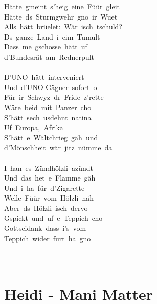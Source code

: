 \documentclass[]{book}
\let\stdsection\section
\renewcommand\section{\clearpage\stdsection}
\begin{document}
Hätte~gmeint~s'heig~eine~Füür~gleit\\
Hätte~ds~Sturmgwehr~gno~ir~Wuet\\
Alls~hätt~brüelet:~Wär~isch~tschuld?\\
Ds~ganze~Land~i~eim~Tumult\\
Dass~me~gschosse~hätt~uf~\\
d'Bundesrät~am~Rednerpult\\
~\\
D'UNO~hätt~interveniert\\
Und~d'UNO-Gägner~sofort~o\\
Für~ir~Schwyz~dr~Fride~z'rette\\
Wäre~beid~mit~Panzer~cho\\
S'hätt~sech~usdehnt~natina\\
Uf~Europa,~Afrika\\
S'hätt~e~Wältchrieg~gäh~und~\\
d'Mönschheit~wär~jitz~nümme~da\\
~\\
I~han~es~Zündhölzli~azündt\\
Und~das~het~e~Flamme~gäh\\
Und~i~ha~für~d'Zigarette\\
Welle~Füür~vom~Hölzli~näh\\
Aber~ds~Hölzli~isch~dervo-\\
Gspickt~und~uf~e~Teppich~cho~-\\
Gottseidank~dass~i's~vom~\\
Teppich~wider~furt~ha~gno\\
~\\
~\\

\hypertarget{heidi---mani-matter}{%
\section{Heidi - Mani Matter}\label{heidi---mani-matter}}
\end{document}

